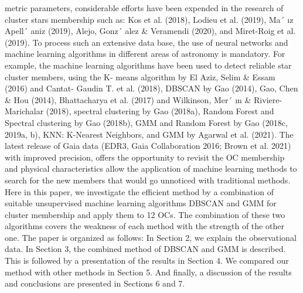 \documentclass[../main.tex]{subfiles}
\begin{document}
metric parameters, considerable efforts have been expended in the
research of cluster stars membership such as: Kos et al. (2018),
Lodieu et al. (2019), Ma´
ız Apell´ aniz (2019), Alejo, Gonz´ alez \&
Veramendi (2020), and Miret-Roig et al. (2019).
To process such an extensive data base, the use of neural networks
and machine learning algorithms in different areas of astronomy
is mandatory. For example, the machine learning algorithms have
been used to detect reliable star cluster members, using the K-
means algorithm by El Aziz, Selim \& Essam (2016) and Cantat-
Gaudin T. et al. (2018), DBSCAN by Gao (2014), Gao, Chen \& Hou
(2014), Bhattacharya et al. (2017) and Wilkinson, Mer´
ın \& Riviere-
Marichalar (2018), spectral clustering by Gao (2018a), Random
Forest and Spectral clustering by Gao (2018b), GMM and Random
Forest by Gao (2018c, 2019a, b), KNN: K-Nearest Neighbors, and
GMM by Agarwal et al. (2021).
The latest release of Gaia data (EDR3, Gaia Collaboration 2016;
Brown et al. 2021) with improved precision, offers the opportunity
to revisit the OC membership and physical characteristics allow
the application of machine learning methods to search for the new
members that would go unnoticed with traditional methods. Here in
this paper, we investigate the efficient method by a combination of
suitable unsupervised machine learning algorithms DBSCAN and GMM for cluster membership and apply them to 12 OCs. The
combination of these two algorithms covers the weakness of each
method with the strength of the other one. The paper is organized as
follows: In Section 2, we explain the observational data. In Section 3,
the combined method of DBSCAN and GMM is described. This is
followed by a presentation of the results in Section 4. We compared
our method with other methods in Section 5. And finally, a discussion
of the results and conclusions are presented in Sections 6 and 7.
\end{document}
